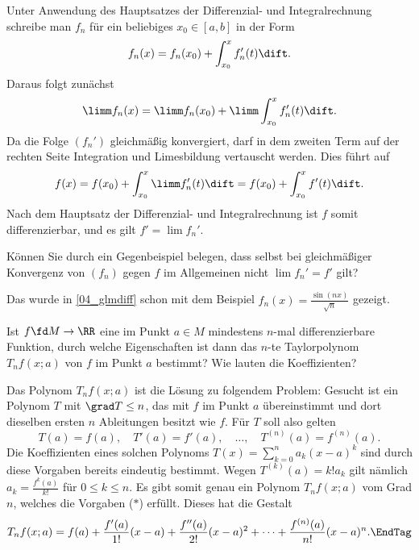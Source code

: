 \begin{antwort}
  Unter Anwendung des Hauptsatzes der 
  Differenzial- und Integralrechnung schreibe man 
  $f_n$ für ein beliebiges $x_0\in [a,b]$ in der Form
  \[
  f_n(x) = f_n (x_0) + \int_{x_0}^x f_n' (t) \dift.
  \]
  Daraus folgt zunächst  
  \[
  \limm f_n(x) = \limm f_n(x_0) + \limm \int_{x_0}^x f_n'( t ) \dift. 
  \]
  Da die Folge $(f_n')$ gleichmäßig konvergiert, darf in dem 
  zweiten Term auf der rechten Seite Integration und Limesbildung 
  vertauscht werden. Dies führt auf
  \[
  f(x) = f(x_0)+ \int_{x_0}^x \limm f_n'(t) \dift = 
  f(x_0)+ \int_{x_0}^x f'(t) \dift.
  \]
  Nach dem Hauptsatz der Differenzial- und Integralrechnung ist 
  $f$ somit differenzierbar, 
  und es gilt $f'=\lim f_n'$. 
  \AntEnd
\end{antwort}

\begin{frage}
  Können Sie durch ein Gegenbeispiel belegen, dass selbst bei  
  gleichmäßiger Konvergenz von $(f_n)$ gegen $f$ im Allgemeinen 
  nicht $\lim f_n'=f'$ gilt?
\end{frage}

\begin{antwort}
  Das wurde in \ref{04_glmdiff} schon mit dem Beispiel 
  $f_n (x) = \frac{\sin(nx)}{\sqrt{n}}$ gezeigt.
  \AntEnd 
\end{antwort}

\begin{frage}
  Ist $f\fd M\to \RR$ eine im Punkt $a\in M$  
  mindestens $n$-mal differenzierbare Funktion, durch welche 
  Eigenschaften ist dann das $n$-te Taylorpolynom 
  $T_n f(x;a)$ von $f$ im Punkt $a$ bestimmt? 
  Wie lauten die Koeffizienten?
\end{frage}

\begin{antwort}
  Das Polynom $T_n f (x;a)$ ist die Lösung zu folgendem Problem:  
  Gesucht ist ein Polynom $T$ mit $\grad T \le n$, das mit $f$ im Punkt 
  $a$ übereinstimmt und dort dieselben ersten $n$ Ableitungen 
  besitzt wie $f$. Für $T$ soll also gelten 
  \begin{equation}
    T(a)=f(a), \quad T'(a)=f'(a), \quad \ldots, 
    \quad T^{(n)}(a) = f^{(n)} (a). 
  \end{equation}
  Die Koeffizienten eines solchen Polynoms 
  $T(x)=\sum_{k=0}^n a_k (x-a)^k$ sind durch diese 
  Vorgaben bereits eindeutig bestimmt. 
  Wegen $T^{(k)}(a)=k! a_k$ gilt 
  nämlich $a_k = \frac{f^{k}(a)}{k!}$ für $0 \le k \le n$. 
  Es gibt somit genau ein Polynom $T_nf(x;a)$ vom Grad $n$, 
  welches die Vorgaben ($\ast$) erfüllt. Dieses hat die Gestalt
  \begin{equation}
    T_nf(x;a) = f(a) + \frac{f'(a)}{1!} (x-a) + 
    \frac{f''(a)}{2!} (x-a)^2 + \cdots + 
    \frac{f^{(n)}(a)}{n!} (x-a)^n. 
    \EndTag
  \end{equation}
\end{antwort}

